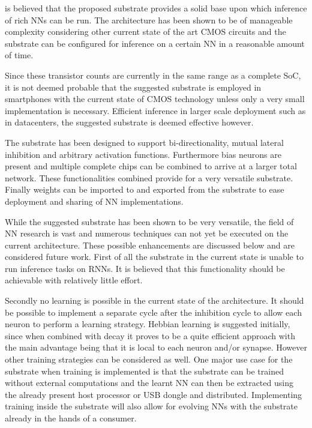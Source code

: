  is believed that the proposed substrate provides a solid base upon which inference of rich \acp{NN} can be run. The architecture has been shown to be of manageable complexity considering other current state of the art \ac{CMOS} circuits and the substrate can be configured for inference on a certain \ac{NN} in a reasonable amount of time.

Since these transistor counts are currently in the same range as a complete \ac{SoC}, it is not deemed probable that the suggested substrate is employed in smartphones with the current state of \ac{CMOS} technology unless only a very small implementation is necessary. Efficient inference in larger scale deployment such as in datacenters, the suggested substrate is deemed effective however. 

The substrate has been designed to support bi-directionality, mutual lateral inhibition and arbitrary activation functions. Furthermore bias neurons are present and multiple complete chips can be combined to arrive at a larger total network. These functionalities combined provide for a very versatile substrate. Finally weights can be imported to and exported from the substrate to ease deployment and sharing of \ac{NN} implementations.

While the suggested substrate has been shown to be very versatile, the field of \ac{NN} research is vast and numerous techniques can not yet be executed on the current architecture. These possible enhancements are discussed below and are considered future work. First of all the substrate in the current state is unable to run inference tasks on \acp{RNN}. It is believed that this functionality should be achievable with relatively little effort.

Secondly no learning is possible in the current state of the architecture. It should be possible to implement a separate cycle after the inhibition cycle to allow each neuron to perform a learning strategy. Hebbian learning is suggested initially, since when combined with decay it proves to be a quite efficient approach with the main advantage being that it is local to each neuron and/or synapse. However other training strategies can be considered as well. One major use case for the substrate when training is implemented is that the substrate can be trained without external computations and the learnt \ac{NN} can then be extracted using the already present host processor or USB dongle and distributed. Implementing training inside the substrate will also allow for evolving \acp{NN} with the substrate already in the hands of a consumer.

